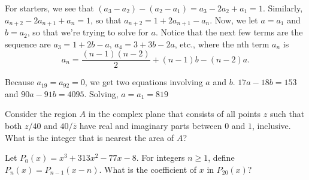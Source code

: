 \begin{solution}[name={Solution by 4everwise}]
	For starters, we see that $(a_3-a_2)-(a_2-a_1)=a_3-2a_2+a_1=1$. Similarly, $a_{n+2}-2a_{n+1}+a_n=1$, so that $a_{n+2}=1+2a_{n+1}-a_n$. Now, we let $a=a_1$ and $b=a_2$, so that we're trying to solve for $a$. Notice that the next few terms are the sequence are $a_3=1+2b-a$, $a_4=3+3b-2a$, etc., where the nth term $a_n$ is $$a_n=\frac{(n-1)(n-2)}{2}+(n-1)b-(n-2)a.$$
	
	Because $a_{19}=a_{92}=0$, we get two equations involving $a$ and $b$. $17a-18b=153$ and $90a-91b=4095$. Solving, $a=a_1=\boxed{819}$
\end{solution}













\begin{question}[name={1992 AIME, \href{https://artofproblemsolving.com/community/c4p430620}{Problem 10}}]
	Consider the region $A$ in the complex plane that consists of all points $z$ such that both ${z}/{40}$ and ${40}/{\overline{z}}$ have real and imaginary parts between $0$ and $1$, inclusive. What is the integer that is nearest the area of $A$?	
\end{question}
%
%
%	
%	
%
%
%









\begin{question}[name={1993 AIME, \href{https://artofproblemsolving.com/community/c4p461986}{Problem 5}}]
	Let $P_0(x) = x^3 + 313x^2 - 77x - 8$. For integers $n \ge 1$, define $P_n(x) = P_{n - 1}(x - n)$. What is the coefficient of $x$ in $P_{20}(x)$?
\end{question}

